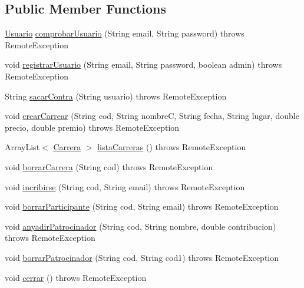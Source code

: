 \subsection*{Public Member Functions}
\begin{DoxyCompactItemize}
\item 
\mbox{\hyperlink{classes_1_1deusto_1_1server_1_1jdo_1_1_usuario}{Usuario}} \mbox{\hyperlink{interfacees_1_1deusto_1_1server_1_1_i_server_a864d05d99ec3891208c39d8352221656}{comprobar\+Usuario}} (String email, String password)  throws Remote\+Exception
\item 
void \mbox{\hyperlink{interfacees_1_1deusto_1_1server_1_1_i_server_af6743c655c7831fa6d87e6e910bb6db4}{registrar\+Usuario}} (String email, String password, boolean admin)  throws Remote\+Exception
\item 
String \mbox{\hyperlink{interfacees_1_1deusto_1_1server_1_1_i_server_a950b819a4f67edf0ef76221dd4714d47}{sacar\+Contra}} (String usuario)  throws Remote\+Exception
\item 
void \mbox{\hyperlink{interfacees_1_1deusto_1_1server_1_1_i_server_a3cb0049dde89f2d81fcc883b19a0c6cf}{crear\+Carrear}} (String cod, String nombreC, String fecha, String lugar, double precio, double premio)  throws Remote\+Exception
\item 
Array\+List$<$ \mbox{\hyperlink{classes_1_1deusto_1_1server_1_1jdo_1_1_carrera}{Carrera}} $>$ \mbox{\hyperlink{interfacees_1_1deusto_1_1server_1_1_i_server_a13c17b07c8114d16130053aecdd455bb}{lista\+Carreras}} ()  throws Remote\+Exception
\item 
void \mbox{\hyperlink{interfacees_1_1deusto_1_1server_1_1_i_server_aaf52191bb3f870f0fcbdd58ffa7bd9c7}{borrar\+Carrera}} (String cod)  throws Remote\+Exception
\item 
void \mbox{\hyperlink{interfacees_1_1deusto_1_1server_1_1_i_server_ab6f6b6b646a79a330ab0b2174d77db44}{incribirse}} (String cod, String email)  throws Remote\+Exception
\item 
void \mbox{\hyperlink{interfacees_1_1deusto_1_1server_1_1_i_server_ac833d9018ade9c49677942317f270046}{borrar\+Participante}} (String cod, String email)  throws Remote\+Exception
\item 
void \mbox{\hyperlink{interfacees_1_1deusto_1_1server_1_1_i_server_a50aa44ec5681089479d0793086a748a1}{anyadir\+Patrocinador}} (String cod, String nombre, double contribucion)  throws Remote\+Exception
\item 
void \mbox{\hyperlink{interfacees_1_1deusto_1_1server_1_1_i_server_a14b52d5f2c1410736c6d74c65a479813}{borrar\+Patrocinador}} (String cod, String cod1)  throws Remote\+Exception
\item 
void \mbox{\hyperlink{interfacees_1_1deusto_1_1server_1_1_i_server_a816dca404c8d1fb6e414a74cbfcdf08e}{cerrar}} ()  throws Remote\+Exception
\end{DoxyCompactItemize}


